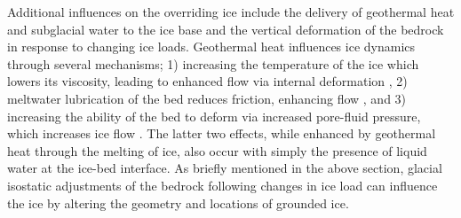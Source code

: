 Additional influences on the overriding ice include the delivery of geothermal heat and subglacial water to the ice base and the vertical deformation of the bedrock in response to changing ice loads. Geothermal heat influences ice dynamics through several mechanisms; 1) increasing the temperature of the ice which lowers its viscosity, leading to  enhanced flow via internal deformation \citep{llubesrelations2006}, 2) meltwater lubrication of the bed reduces friction, enhancing flow \citep{pollardsensitivity2005}, and 3) increasing the ability of the bed to deform via increased pore-fluid pressure, which increases ice flow \citep{tulaczykbasal2000}. The latter two effects, while enhanced by geothermal heat through the melting of ice, also occur with simply the presence of liquid water at the ice-bed interface. As briefly mentioned in the above section, glacial isostatic adjustments of the bedrock following changes in ice load can influence the ice by altering the geometry and locations of grounded ice. \\

